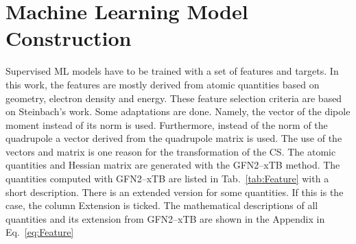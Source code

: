 \section{Machine Learning Model Construction}

Supervised ML models have to be trained with a set of features and targets.
In this work, the features are mostly derived from atomic quantities based on geometry, electron density and energy.
These feature selection criteria are based on Steinbach's work.\supercite{PitMA} Some adaptations are done.
Namely, the vector of the dipole moment instead of its norm is used.
Furthermore, instead of the norm of the quadrupole a vector derived from the quadrupole matrix is used.
The use of the vectors and matrix is one reason for the transformation of the CS.
The atomic quantities and Hessian matrix are generated with the GFN2--xTB method.
The quantities computed with GFN2--xTB are listed in Tab.~\ref{tab:Feature} with a short description.
There is an extended version for some quantities. If this is the case, the column Extension is ticked.
The mathematical descriptions of all quantities and its extension from GFN2--xTB are shown in the Appendix in Eq.~\eqref{eq:Feature}\\

